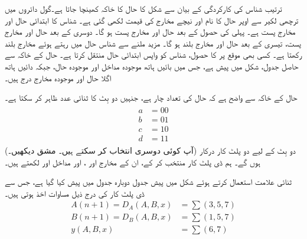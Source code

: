 \quad
ترتیب شناس کی کارکردگی کے بیان سے شکل  کا حال کا خاکہ کھینچا جاتا ہے۔گول دائروں میں ترچھی لکیر سے اوپر حال کا نام اور نیچے مخارج کی قیمت لکھی گئی ہے۔ شناس کا ابتدائی حال  اور مخارج پست  ہے۔ پہلی   کی  حصول کے بعد حال  اور مخارج پست ہو گا۔ دوسری   کے بعد حال  اور مخارج پست، تیسری  کے بعد حال  اور مخارج بلند ہو گا۔ مزید  ملنے سے شناس حال  میں رہتے ہوئے مخارج بلند رکھتا ہے۔ کسی بھی موقع پر  کا حصول، شناس کو واپس ابتدائی حال  منتقل کرتا ہے۔ حال  کے خاکہ سے حاصل جدول، شکل  میں پیش ہے، جس میں بائیں ہاتھ موجودہ مداخل اور موجودہ حال، جبکہ دائیں ہاتھ اگلا حال اور موجودہ مخارج درج ہیں۔

حال  کے خاکہ سے واضح ہے کہ حال کی تعداد چار ہے، جنہیں دو بِٹ کا ثنائی عدد ظاہر کر سکتا ہے۔
\begin{gather}
\begin{aligned}\label{مساوات_ترتیبی_شناس_حال_انتخاب}
a&=00\\
b&=01\\
c&=10\\
d&=11
\end{aligned}
\end{gather}
(آپ کوئی دوسری انتخاب کر سکتے ہیں۔ مشق  دیکھیں۔) دو بِٹ کے لیے دو پلٹ کار درکار ہوں گے۔ ہم ڈی پلٹ کار منتخب کر کے، ان کے مخارج  اور ، اور مداخل  اور  لکھتے ہیں۔

ثنائی علامت استعمال کرتے ہوئے شکل  میں پیش جدول دوبارہ جدول  میں پیش کیا گیا ہے، جس سے ڈی پلٹ کار کی درج ذیل مساوات اخذ ہوتی ہیں۔
\begin{align*}
A(n+1)=D_A(A,B,x)&=\sum(3,5,7)\\
B(n+1)=D_B(A,B,x)&=\sum(1,5,7)\\
y(A,B,x)&=\sum(6,7)
\end{align*}

